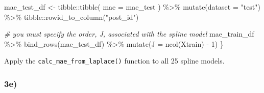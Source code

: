 \documentclass[
]{article}
\newenvironment{Shaded}{\begin{snugshade}}{\end{snugshade}}
\newcommand{\AttributeTok}[1]{\textcolor[rgb]{0.77,0.63,0.00}{#1}}
\newcommand{\CommentTok}[1]{\textcolor[rgb]{0.56,0.35,0.01}{\textit{#1}}}
\newcommand{\DecValTok}[1]{\textcolor[rgb]{0.00,0.00,0.81}{#1}}
\newcommand{\FunctionTok}[1]{\textcolor[rgb]{0.00,0.00,0.00}{#1}}
\newcommand{\NormalTok}[1]{#1}
\newcommand{\OtherTok}[1]{\textcolor[rgb]{0.56,0.35,0.01}{#1}}
\newcommand{\SpecialCharTok}[1]{\textcolor[rgb]{0.00,0.00,0.00}{#1}}
\newcommand{\StringTok}[1]{\textcolor[rgb]{0.31,0.60,0.02}{#1}}
\begin{document}
\begin{Shaded}
\begin{Highlighting}[]
\NormalTok{  mae\_test\_df }\OtherTok{\textless{}{-}}\NormalTok{ tibble}\SpecialCharTok{::}\FunctionTok{tibble}\NormalTok{(}
    \AttributeTok{mae =}\NormalTok{ mae\_test}
\NormalTok{  ) }\SpecialCharTok{\%\textgreater{}\%} 
    \FunctionTok{mutate}\NormalTok{(}\AttributeTok{dataset =} \StringTok{"test"}\NormalTok{) }\SpecialCharTok{\%\textgreater{}\%} 
\NormalTok{    tibble}\SpecialCharTok{::}\FunctionTok{rowid\_to\_column}\NormalTok{(}\StringTok{"post\_id"}\NormalTok{)}
  
  \CommentTok{\# you must specify the order, J, associated with the spline model}
\NormalTok{  mae\_train\_df }\SpecialCharTok{\%\textgreater{}\%} 
    \FunctionTok{bind\_rows}\NormalTok{(mae\_test\_df) }\SpecialCharTok{\%\textgreater{}\%} 
    \FunctionTok{mutate}\NormalTok{(}\AttributeTok{J =} \FunctionTok{ncol}\NormalTok{(Xtrain) }\SpecialCharTok{{-}} \DecValTok{1}\NormalTok{)}
\NormalTok{\}}
\end{Highlighting}
\end{Shaded}

Apply the \texttt{calc\_mae\_from\_laplace()} function to all 25 spline
models.

\begin{Shaded}
\end{Shaded}

\hypertarget{e-2}{%
\subsubsection{3e)}\label{e-2}}
\end{document}
